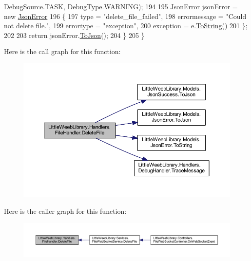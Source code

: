 \begin{DoxyCode}
      \mbox{\hyperlink{namespace_little_weeb_library_1_1_handlers_a2a6ca0775121c9c503d58aa254d292be}{DebugSource}}.TASK, \mbox{\hyperlink{namespace_little_weeb_library_1_1_handlers_ab66019ed40462876ec4e61bb3ccb0a62}{DebugType}}.WARNING);
194 
195                 \mbox{\hyperlink{class_little_weeb_library_1_1_models_1_1_json_error}{JsonError}} jsonError = \textcolor{keyword}{new} \mbox{\hyperlink{class_little_weeb_library_1_1_models_1_1_json_error}{JsonError}}
196                 \{
197                     type = \textcolor{stringliteral}{"delete\_file\_failed"},
198                     errormessage = \textcolor{stringliteral}{"Could not delete file."},
199                     errortype = \textcolor{stringliteral}{"exception"},
200                     exception = e.\mbox{\hyperlink{class_little_weeb_library_1_1_models_1_1_json_error_ad7d5522c90119111d2e929f39e7f6d3c}{ToString}}()
201                 \};
202 
203                 \textcolor{keywordflow}{return} jsonError.\mbox{\hyperlink{class_little_weeb_library_1_1_models_1_1_json_error_a0e3e7dd2e2990404b7f0461742b23440}{ToJson}}();
204             \}
205         \}
\end{DoxyCode}
Here is the call graph for this function\+:\nopagebreak
\begin{figure}[H]
\begin{center}
\leavevmode
\includegraphics[width=350pt]{class_little_weeb_library_1_1_handlers_1_1_file_handler_ae1b342c4d821543a0a3400e4e0c95903_cgraph}
\end{center}
\end{figure}
Here is the caller graph for this function\+:\nopagebreak
\begin{figure}[H]
\begin{center}
\leavevmode
\includegraphics[width=350pt]{class_little_weeb_library_1_1_handlers_1_1_file_handler_ae1b342c4d821543a0a3400e4e0c95903_icgraph}
\end{center}
\end{figure}
